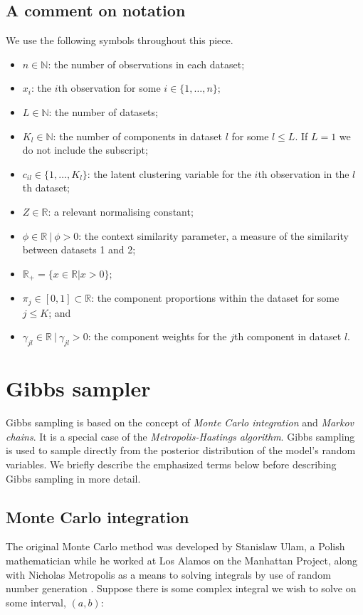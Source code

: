 \documentclass[11pt]{article} %
\begin{document}
\subsection*{A comment on notation}
We use the following symbols throughout this piece.
\begin{itemize}
 \item $n \in \mathbb{N}$: the number of observations in each dataset;
 \item $x_i$: the $i$th observation for some $i \in \{1,\ldots, n\}$;
 \item $L  \in \mathbb{N}$: the number of datasets;
 \item $K_l \in \mathbb{N}$: the number of components in dataset $l$ for some $l \leq L$. If $L = 1$ we do not include the subscript;
 \item $c_{il} \in \{1,\ldots,K_l\}$: the latent clustering variable for the $i$th observation in the $l$th dataset;
 \item $Z \in \mathbb{R}$: a relevant normalising constant;
 \item $\phi \in \mathbb{R} \: | \: \phi > 0$: the context similarity parameter, a measure of the similarity between datasets 1 and 2;
 \item $\mathbb{R}_+ = \{x \in \mathbb{R} | x > 0\};$
 \item $\pi_j \in [0, 1] \subset \mathbb{R}$: the component proportions within the dataset for some $j \leq K$; and
 \item $\gamma_{jl} \in \mathbb{R}  \: | \: \gamma_{jl} > 0$: the component weights for the $j$th component in dataset $l$.
\end{itemize}

\section{Gibbs sampler}
Gibbs sampling is based on the concept of \emph{Monte Carlo integration} and \emph{Markov chains}. It is a special case of the \emph{Metropolis-Hastings algorithm}. Gibbs sampling is used to sample directly from the posterior distribution of the model's random variables. We briefly describe the emphasized terms below before describing Gibbs sampling in more detail.

\subsection{Monte Carlo integration}
The original Monte Carlo method was developed by Stanislaw Ulam, a Polish mathematician while he worked at Los Alamos on the Manhattan Project, along with Nicholas Metropolis \cite{CooperCardinalsChaosReflection1989} as a means to solving integrals by use of random number generation \cite{MetropolisMonteCarloMethod1949}. Suppose there is some complex integral we wish to solve on some interval, $(a,b)$:
\end{document}
